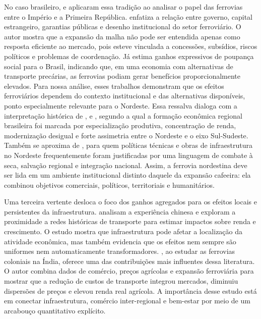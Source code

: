 \documentclass[12pt,a4paper]{article}
\begin{document}
No caso brasileiro, \citet{summerhill2003} e \citet{summerhill2005} aplicaram essa tradição ao analisar o papel das ferrovias entre o Império e a Primeira República. \citet{summerhill2003} enfatiza a relação entre governo, capital estrangeiro, garantias públicas e desenho institucional do setor ferroviário. O autor mostra que a expansão da malha não pode ser entendida apenas como resposta eficiente ao mercado, pois esteve vinculada a concessões, subsídios, riscos políticos e problemas de coordenação. Já \citet{summerhill2005} estima ganhos expressivos de poupança social para o Brasil, indicando que, em uma economia com alternativas de transporte precárias, as ferrovias podiam gerar benefícios proporcionalmente elevados. Para nossa análise, esses trabalhos demonstram que os efeitos ferroviários dependem do contexto institucional e das alternativas disponíveis, ponto especialmente relevante para o Nordeste. Essa ressalva dialoga com a interpretação histórica de \citet{furtado1959}, \citet{cano1977} e \citet{eisenberg1974}, segundo a qual a formação econômica regional brasileira foi marcada por especialização produtiva, concentração de renda, modernização desigual e forte assimetria entre o Nordeste e o eixo Sul-Sudeste. Também se aproxima de \citet{buckley2000}, para quem políticas técnicas e obras de infraestrutura no Nordeste frequentemente foram justificadas por uma linguagem de combate à seca, salvação regional e integração nacional. Assim, a ferrovia nordestina deve ser lida em um ambiente institucional distinto daquele da expansão cafeeira: ela combinou objetivos comerciais, políticos, territoriais e humanitários.

Uma terceira vertente desloca o foco dos ganhos agregados para os efeitos locais e persistentes da infraestrutura. \citet{banerjee2012} analisam a experiência chinesa e exploram a proximidade a redes históricas de transporte para estimar impactos sobre renda e crescimento. O estudo mostra que infraestrutura pode afetar a localização da atividade econômica, mas também evidencia que os efeitos nem sempre são uniformes nem automaticamente transformadores. \citet{donaldson2018}, ao estudar as ferrovias coloniais na Índia, oferece uma das contribuições mais influentes dessa literatura. O autor combina dados de comércio, preços agrícolas e expansão ferroviária para mostrar que a redução de custos de transporte integrou mercados, diminuiu dispersões de preços e elevou renda real agrícola. A importância desse estudo está em conectar infraestrutura, comércio inter-regional e bem-estar por meio de um arcabouço quantitativo explícito.
\end{document}
